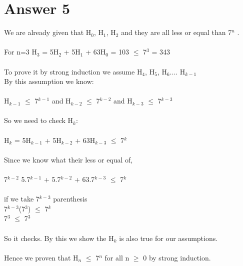 \documentclass[12pt]{article}
\begin{document}
\section*{Answer 5}

We are already given that H$_0$, H$_1$, H$_2$ and they are all less or equal than 7$^n$ .\\
\\
For n=3 H$_3$ = 5H$_2$ + 5H$_1$ + 63H$_0$ = 103 $\leq$ 7$^3$ = 343\\
\\
To prove it by strong induction we assume  H$_4$,  H$_5$,  H$_6$....  H$_{k-1}$\\
By this assumption we know:\\
\\
H$_{k-1}$ $\leq$ 7$^{k-1}$ and H$_{k-2}$ $\leq$ 7$^{k-2}$ and H$_{k-3}$ $\leq$ 7$^{k-3}$\\
\\
So we need to check H$_{k}$:\\
\\
H$_{k}$ =  5H$_{k-1}$ + 5H$_{k-2}$ + 63H$_{k-3}$ $\leq$ 7$^{k}$\\
\\ Since we know what their less or equal of,\\
\\
7$^{k-2}$ 5.7$^{k-1}$ + 5.7$^{k-2}$ + 63.7$^{k-3}$ $\leq$ 7$^{k}$ \\
\\ if we take 7$^{k-3}$ parenthesis\\
7$^{k-3}$(7$^3$) $\leq$ 7$^{k}$\\
7$^3$ $\leq$ 7$^3$\\
\\ So it checks. By this we show the H$_{k}$ is also true for our assumptions.\\
\\
Hence we proven that H$_{n}$ $\leq$ 7$^{n}$ for all n $\geq$ 0 by strong induction.



 
\end{document}
